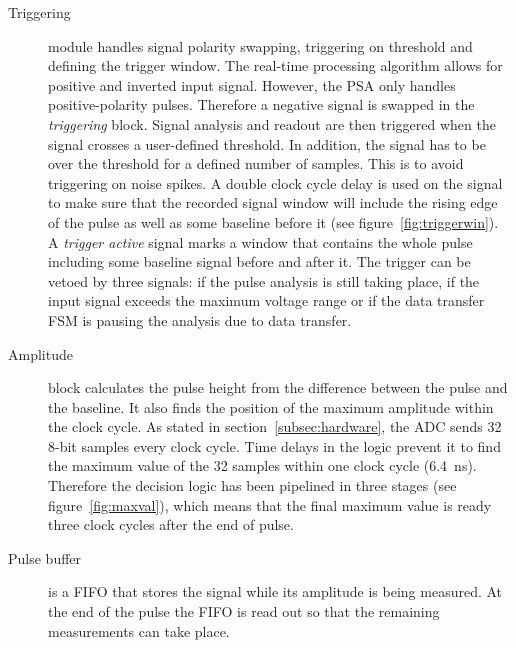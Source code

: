 \documentclass[12pt]{packages/mytustyle}  %
\begin{document}
\begin{description}
\item[Triggering] module handles signal polarity swapping, triggering on threshold and defining the trigger window. The real-time processing algorithm allows for positive and inverted input signal. However, the PSA only handles positive-polarity pulses. Therefore a negative signal is swapped in the \textit{triggering} block. Signal analysis and readout are then triggered when the signal crosses a user-defined threshold. In addition, the signal has to be over the threshold for a defined number of samples. This is to avoid triggering on noise spikes.
A double clock cycle delay is used on the signal to make sure that the recorded signal window will include the rising edge of the pulse as well as some baseline before it (see figure~\ref{fig:triggerwin}). A \textit{trigger active} signal marks a window that contains the whole pulse including some baseline signal before and after it. 
The trigger can be vetoed by three signals: if the pulse analysis is still taking place, if the input signal exceeds the maximum voltage range or if the data transfer FSM is pausing the analysis due to data transfer.

%


\item[Amplitude] block calculates the pulse height from the difference between the pulse and the baseline. It also finds the position of the maximum amplitude within the clock cycle. As stated in section~\ref{subsec:hardware}, the ADC sends 32 8-bit samples every clock cycle. Time delays in the logic prevent it to find the maximum value of the 32 samples within one clock cycle (6.4~ns). Therefore the decision logic has been pipelined in three stages (see figure~\ref{fig:maxval}), which means that the final maximum value is ready three clock cycles after the end of pulse.
\item[Pulse buffer] is a FIFO that stores the signal while its amplitude is being measured. At the end of the pulse the FIFO is read out so that the remaining measurements can take place. 


\end{description}
\end{document}
